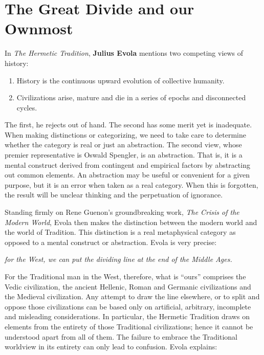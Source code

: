 \section{The Great Divide and our Ownmost}

In \emph{The Hermetic Tradition}, \textbf{Julius Evola} mentions two competing views of history:

\begin{enumerate}


\item History is the continuous upward evolution of collective humanity.

\item Civilizations arise, mature and die in a series of epochs and disconnected cycles.
\end{enumerate}


The first, he rejects out of hand. The second has some merit yet is inadequate. When making distinctions or categorizing, we need to take care to determine whether the category is real or just an abstraction. The second view, whose premier representative is Oswald Spengler, is an abstraction. That is, it is a mental construct derived from contingent and empirical factors by abstracting out common elements. An abstraction may be useful or convenient for a given purpose, but it is an error when taken as a real category. When this is forgotten, the result will be unclear thinking and the perpetuation of ignorance.

Standing firmly on Rene Guenon's groundbreaking work, \emph{The Crisis of the Modern World}, Evola then makes the distinction between the modern world and the world of Tradition. This distinction is a real metaphysical category as opposed to a mental construct or abstraction. Evola is very precise:

\begin{quotex}
\emph{for the West, we can put the dividing line at the end of the Middle Ages.}
\end{quotex}


For the Traditional man in the West, therefore, what is ``ours'' comprises the Vedic civilization, the ancient Hellenic, Roman and Germanic civilizations and the Medieval civilization. Any attempt to draw the line elsewhere, or to split and oppose those civilizations can be based only on artificial, arbitrary, incomplete and misleading considerations. In particular, the Hermetic Tradition draws on elements from the entirety of those Traditional civilizations; hence it cannot be understood apart from all of them. The failure to embrace the Traditional worldview in its entirety can only lead to confusion. Evola explains:


